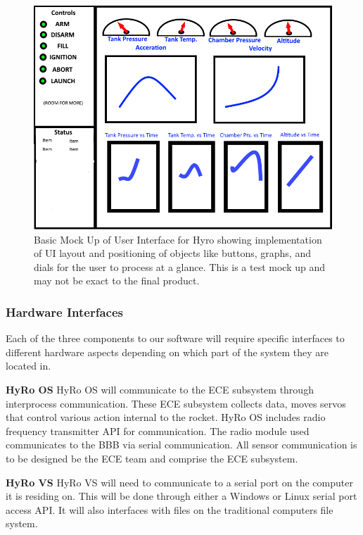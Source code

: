 \documentclass[10pt,draftclsnofoot,onecolumn,compsoc]{IEEEtran}
\begin{document}
\begin{figure}
  \caption{Basic Mock Up of User Interface for Hyro showing implementation of UI layout and positioning of objects like buttons, graphs, and dials for the user to process at a glance. This is a test mock up and may not be exact to the final product. }
  \centering
	\includegraphics[scale=.75]{HyRoUIMockup}
\end{figure}
\FloatBarrier
\subsubsection{Hardware Interfaces}
Each of the three components to our software will require specific interfaces to different hardware aspects depending on which part of the system they are located in.\par

{\bf HyRo OS}
 	HyRo OS will communicate to the ECE subsystem through interprocess communication. These ECE subsystem collects data, moves servos that control various action internal to the rocket. HyRo OS includes radio frequency transmitter API for communication. The radio module used communicates to the BBB via serial communication. All sensor communication is to be designed be the ECE team and comprise the ECE subsystem.\par

{\bf HyRo VS}
HyRo VS will need to communicate to a serial port on the computer it is residing on.  This will be done through either a Windows or Linux serial port access API. It will also interfaces with files on the traditional computers file system.
\end{document}
